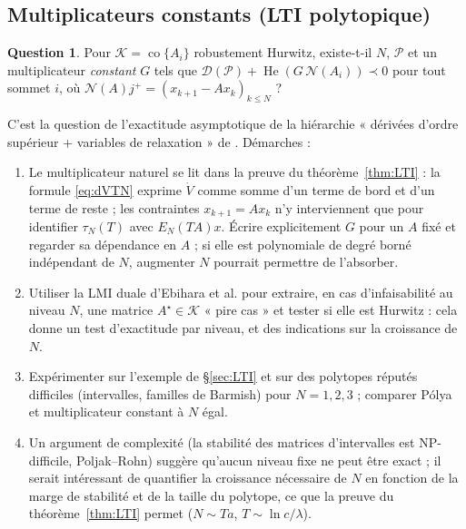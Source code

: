 \documentclass[11pt,a4paper]{article}
\theoremstyle{definition}
\newtheorem{question}{Question}
\theoremstyle{remark}
\newcommand{\co}{\operatorname{co}}
\DeclareMathOperator{\He}{He}
\begin{document}
\subsection{Multiplicateurs constants (LTI polytopique)}\label{sec:Q1}
\begin{question}\label{q:const}
Pour $\mathcal K=\co\{A_i\}$ robustement Hurwitz, existe-t-il $N$, $\mathcal P$ et un multiplicateur \emph{constant} $G$ tels que
$\mathcal D(\mathcal P) + \He(G\,\mathcal N(A_i))\prec 0$ pour tout sommet $i$, où $\mathcal N(A)j^+ = (x_{k+1}-Ax_k)_{k\le N}$ ?
\end{question}
C'est la question de l'exactitude asymptotique de la hiérarchie « dérivées d'ordre supérieur + variables de relaxation » de \cite{EPAH}. Démarches :
\begin{enumerate}[nosep,label=(\alph*)]
\item Le multiplicateur naturel se lit dans la preuve du théorème~\ref{thm:LTI} : la formule \eqref{eq:dVTN} exprime $\dot V$ comme somme d'un terme de bord et d'un terme de reste ; les contraintes $x_{k+1}=Ax_k$ n'y interviennent que pour identifier $\tau_N(T)$ avec $E_N(TA)x$. Écrire explicitement $G$ pour un $A$ fixé et regarder sa dépendance en $A$ ; si elle est polynomiale de degré borné indépendant de $N$, augmenter $N$ pourrait permettre de l'absorber.
\item Utiliser la LMI duale d'Ebihara et al. pour extraire, en cas d'infaisabilité au niveau $N$, une matrice $A^\star\in\mathcal K$ « pire cas » et tester si elle est Hurwitz : cela donne un test d'exactitude par niveau, et des indications sur la croissance de $N$.
\item Expérimenter sur l'exemple de \S\ref{sec:LTI} et sur des polytopes réputés difficiles (intervalles, familles de Barmish) pour $N=1,2,3$ ; comparer Pólya et multiplicateur constant à $N$ égal.
\item Un argument de complexité (la stabilité des matrices d'intervalles est NP-difficile, Poljak–Rohn) suggère qu'aucun niveau fixe ne peut être exact ; il serait intéressant de quantifier la croissance nécessaire de $N$ en fonction de la marge de stabilité et de la taille du polytope, ce que la preuve du théorème~\ref{thm:LTI} permet ($N\sim Ta$, $T\sim\ln c/\lambda$).
\end{enumerate}
\end{document}
